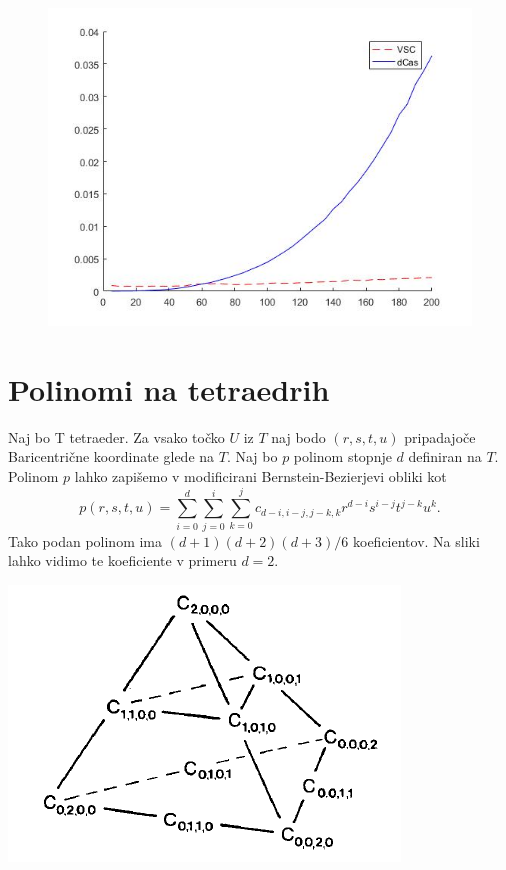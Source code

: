 \documentclass{article}
\begin{document}
\begin{figure}[h]
\centering
\begin{minipage}{.5\textwidth}
\centering
\includegraphics[scale=0.3]{vsc}
\label{fig:vsc}
\end{minipage}
\end{figure}

\newpage

\section{Polinomi na tetraedrih}

Naj bo T tetraeder. Za vsako točko $U$ iz $T$ naj bodo $(r,s,t,u)$ pripadajoče Baricentrične koordinate glede na $T$.  Naj bo $p$ polinom stopnje $d$ definiran na $T$. Polinom $p$ lahko zapišemo v modificirani Bernstein-Bezierjevi obliki kot 
$$p(r,s,t,u) = \sum_{i = 0}^d{\sum_{j=0}^{i}{\sum_{k = 0}^{j}{c_{d-i,i-j,j-k,k} r^{d-i} s^{i-j} t^{j-k} u^k}}}.$$
Tako podan polinom ima $(d+1)(d+2)(d+3)/6$ koeficientov. Na sliki lahko vidimo te koeficiente v primeru $d=2$.

\begin{center}
\includegraphics[width=.7\linewidth]{tetraeder.PNG}
\end{center}
\end{document}
